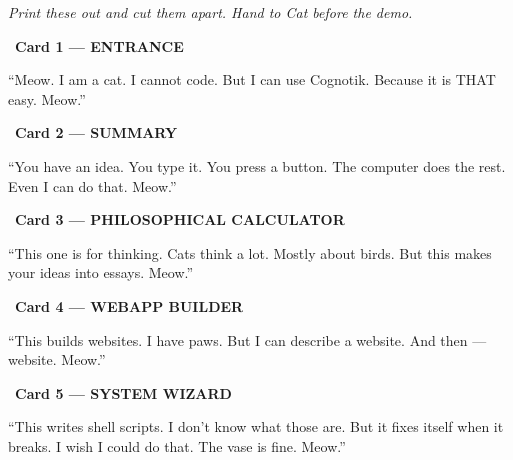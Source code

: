 \documentclass[12pt, letterpaper]{article}
\begin{document}
  \begin{center}
    \textit{Print these out and cut them apart. Hand to Cat before the demo.}
  \end{center}

  \bigskip

  \begin{cuecard}
    \begin{center}
      {\Large {}\ \textbf{\color{catpink}Card 1 — ENTRANCE}}
    \end{center}
    \medskip
    {\large
    ``Meow. I am a cat. I cannot code.
    But I can use Cognotik. Because it is THAT easy. Meow.''}
  \end{cuecard}

  \begin{cuecard}
    \begin{center}
      {\Large {}\ \textbf{\color{catpink}Card 2 — SUMMARY}}
    \end{center}
    \medskip
    {\large
    ``You have an idea. You type it. You press a button.
    The computer does the rest. Even I can do that. Meow.''}
  \end{cuecard}

  \begin{cuecard}
    \begin{center}
      {\Large {}\ \textbf{\color{catpink}Card 3 — PHILOSOPHICAL CALCULATOR}}
    \end{center}
    \medskip
    {\large
    ``This one is for thinking. Cats think a lot.
    Mostly about birds. But this makes your ideas into essays. Meow.''}
  \end{cuecard}

  \begin{cuecard}
    \begin{center}
      {\Large {}\ \textbf{\color{catpink}Card 4 — WEBAPP BUILDER}}
    \end{center}
    \medskip
    {\large
    ``This builds websites. I have paws. But I can describe a website.
    And then — website. Meow.''}
  \end{cuecard}

  \begin{cuecard}
    \begin{center}
      {\Large {}\ \textbf{\color{catpink}Card 5 — SYSTEM WIZARD}}
    \end{center}
    \medskip
    {\large
    ``This writes shell scripts. I don't know what those are.
    But it fixes itself when it breaks. I wish I could do that.
    The vase is fine. Meow.''}
  \end{cuecard}
\end{document}
